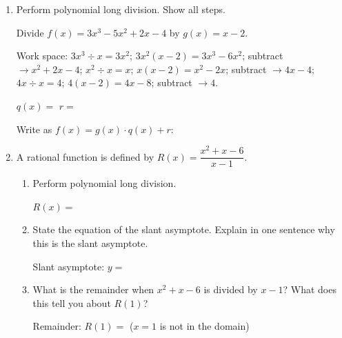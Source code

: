 \documentclass[10pt]{article}
\begin{document}
\begin{enumerate}[itemsep=18pt]
\item Perform polynomial long division. Show all steps.

      Divide $f(x) = 3x^3 - 5x^2 + 2x - 4$ by $g(x) = x - 2$.

      \vspace{0.1in}
      Work space: $3x^3\div x = 3x^2$; $3x^2(x-2)=3x^3-6x^2$; subtract $\to x^2+2x-4$;
      $x^2\div x = x$; $x(x-2)=x^2-2x$; subtract $\to 4x-4$;
      $4x\div x = 4$; $4(x-2)=4x-8$; subtract $\to 4$.

      $q(x) = $ \smash{\gradedblank[id=hw2a, type=short, points=2, answer={3x^2 + x + 4}]{5cm}{11pt}} \quad $r = $ \smash{\gradedblank[id=hw2b, type=short, points=1, answer={4}]{2cm}{11pt}}

      Write as $f(x) = g(x)\cdot q(x) + r$: \smash{\gradedblank[id=hw2c, type=short, points=1, answer={(x-2)(3x^2+x+4)+4}]{8cm}{11pt}}

\item A rational function is defined by $\displaystyle R(x) = \dfrac{x^2 + x - 6}{x - 1}$.

      \begin{enumerate}[label=(\alph*), itemsep=8pt]
        \item Perform polynomial long division.

              \vspace{0.06in}
              $R(x) = $ \smash{\gradedblank[id=hw3a, type=short, points=2, answer={x+2+\frac{-4}{x-1}}, display={$x+2+(-4)/(x-1)$}]{8cm}{13pt}}

        \item State the equation of the slant asymptote. Explain in one sentence why this is
              the slant asymptote.

              \vspace{0.06in}
              Slant asymptote: $y = $ \smash{\gradedblank[id=hw3b1, type=short, points=1, answer={x+2}]{3cm}{11pt}}

              \rubricbox{\gradedblank[id=hw3b2, type=rubric, points=1,
  display={As $x\to\pm\infty$, the remainder $-4/(x-1)\to 0$, so $R(x)$ approaches $y=x+2$.}]{\linewidth}{8pt}}

        \item What is the remainder when $x^2+x-6$ is divided by $x-1$? What does this tell
              you about $R(1)$?

              \vspace{0.06in}
              Remainder: \smash{\gradedblank[id=hw3c1, type=short, points=1, answer={-4}]{2cm}{13pt}} \quad $R(1) = $ \smash{\gradedblank[id=hw3c2, type=short, check=text, points=1, answer={undefined}]{2cm}{13pt}} ($x=1$ is not in the domain)
      \end{enumerate}


\end{enumerate}
\end{document}
